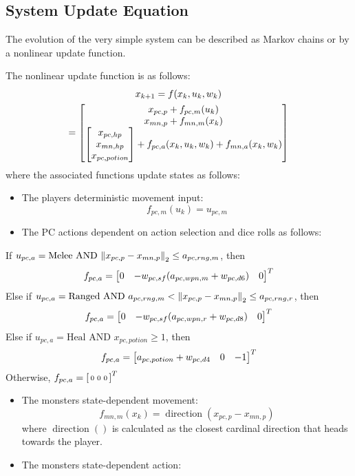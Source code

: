 \documentclass[letterpaper, 10 pt, conference]{ieeeconf}
\begin{document}
\pagebreak
\subsection{System Update Equation}
The evolution of the very simple system can be described as Markov chains or by a nonlinear update function.

The nonlinear update function is as follows: \begin{multline}
    x_{k+1} = f(x_k, u_k, w_k)\\
    = \mqty[
        x_{pc,p} + f_{pc,m}(u_k)\\
        x_{mn,p} + f_{mn,m}(x_k)\\
        \mqty[x_{pc,hp}\\ x_{mn,hp} \\ x_{pc,potion}] + f_{pc,a}(x_k,u_k,w_k) + f_{mn,a}(x_k,w_k)
    ]
\end{multline}
where the associated functions update states as follows: 
\begin{itemize}
    \item The players deterministic movement input: \[
        f_{pc,m}(u_k) = u_{pc,m}
    \]
    \item The PC actions dependent on action selection and dice rolls as follows:
\end{itemize} %

If $u_{pc,a} = \text{Melee} \text{ AND } \norm{x_{pc,p} - x_{mn,p}}_2 \leq a_{pc,rng,m}$, then \[
        f_{pc,a} = \mqty[0 & -w_{pc,sf}(a_{pc,wpn,m} + w_{pc,d6}) & 0]^T 
    \] 
Else if $u_{pc,a} = \text{Ranged} \text{ AND } a_{pc,rng,m} < \norm{x_{pc,p} - x_{mn,p}}_2 \leq a_{pc,rng,r}$, then \[
        f_{pc,a} = \mqty[0 & -w_{pc,sf}(a_{pc,wpn,r} + w_{pc,d8}) & 0]^T
    \]
Else if $u_{pc,a} = \text{Heal} \text{ AND } x_{pc,potion} \geq 1$, then \[
        f_{pc,a} = \mqty[a_{pc,potion} + w_{pc,d4} & 0 & -1]^T
    \]
Otherwise, $f_{pc,a} = \smqty[0 & 0 & 0]^T$

\begin{itemize} %
    \item The monsters state-dependent movement:\[
        f_{mn,m}(x_k) = \operatorname{direction}(x_{pc,p} - x_{mn,p})
    \] where $\operatorname{direction}()$ is calculated as the closest cardinal direction that heads towards the player.
    \item The monsters state-dependent action: 
\end{itemize}
\end{document}
